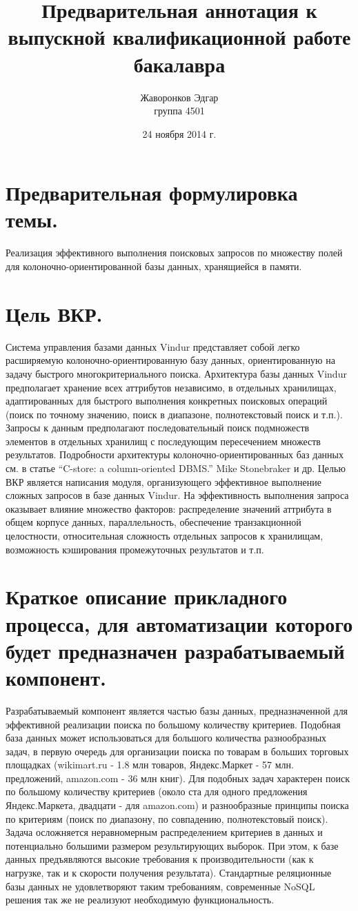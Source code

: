 \documentclass[12pt]{article}
\author{Жаворонков Эдгар \\ группа 4501}
\title{Предварительная аннотация к выпускной квалификационной работе бакалавра}
\date{24 ноября 2014 г.}
\begin{document}
    \section{Предварительная формулировка темы.}
        Реализация эффективного выполнения поисковых запросов по множеству полей для колоночно-ориентированной базы данных, хранящиейся в памяти.
    \section{Цель ВКР.}
        Система управления базами данных Vindur представляет собой легко расширяемую колоночно-ориентированную базу данных, ориентированную на задачу быстрого многокритериального поиска. Архитектура базы данных Vindur предполагает хранение всех аттрибутов независимо, в отдельных хранилищах, адаптированных для быстрого выполнения конкретных поисковых операций (поиск по точному значению, поиск в диапазоне, полнотекстовый поиск и т.п.). Запросы к данным предполагают последовательный поиск подмножеств элементов в отдельных хранилищ с последующим пересечением множеств результатов. Подробности архитектуры колоночно-ориентированных баз данных см. в статье ``C-store: a column-oriented DBMS.'' Mike Stonebraker и др.
        Целью ВКР является написания модуля, организующего эффективное выполнение сложных запросов в базе данных Vindur. На эффективность выполнения запроса оказывает влияние множество факторов: распределение значений аттрибута в общем корпусе данных, параллельность, обеспечение транзакционной целостности, относительная сложность отдельных запросов к хранилищам, возможность кэширования промежуточных результатов и т.п.
    \section{Краткое описание прикладного процесса, для автоматизации которого будет предназначен разрабатываемый компонент.}
        Разрабатываемый компонент является частью базы данных, предназначенной для эффективной реализации поиска по большому количеству критериев. Подобная база данных может использоваться для большого количества разнообразных задач, в первую очередь для организации поиска по товарам в больших торговых площадках (wikimart.ru - 1.8 млн товаров, Яндекс.Маркет - 57 млн. предложений, amazon.com - 36 млн книг). Для подобных задач характерен поиск по большому количеству критериев (около ста для одного предложения Яндекс.Маркета, двадцати - для amazon.com) и разнообразные принципы поиска по критериям (поиск по диапазону, по совпадению, полнотекстовый поиск). Задача осложняется неравномерным распределением критериев в данных и потенциально большими размером результирующих выборок. При этом, к базе данных предъявляются высокие требования к производительности (как к нагрузке, так и к скорости получения результата). Стандартные реляционные базы данных не удовлетворяют таким требованиям, современные NoSQL решения так же не реализуют необходимую функциональность.
\end{document}
